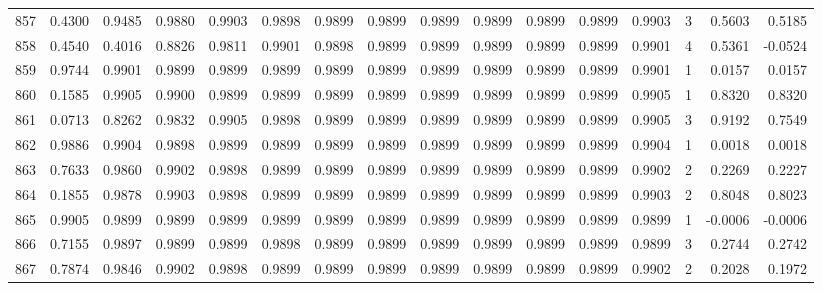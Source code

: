 \begin{tabular}{lrrrrrrrrrrrrrrr}
857 &      0.4300 &  0.9485 &  0.9880 &  0.9903 &  0.9898 &  0.9899 &  0.9899 &  0.9899 &  0.9899 &  0.9899 &   0.9899 &     0.9903 &      3 &                    0.5603 &                     0.5185 \\
858 &      0.4540 &  0.4016 &  0.8826 &  0.9811 &  0.9901 &  0.9898 &  0.9899 &  0.9899 &  0.9899 &  0.9899 &   0.9899 &     0.9901 &      4 &                    0.5361 &                    -0.0524 \\
859 &      0.9744 &  0.9901 &  0.9899 &  0.9899 &  0.9899 &  0.9899 &  0.9899 &  0.9899 &  0.9899 &  0.9899 &   0.9899 &     0.9901 &      1 &                    0.0157 &                     0.0157 \\
860 &      0.1585 &  0.9905 &  0.9900 &  0.9899 &  0.9899 &  0.9899 &  0.9899 &  0.9899 &  0.9899 &  0.9899 &   0.9899 &     0.9905 &      1 &                    0.8320 &                     0.8320 \\
861 &      0.0713 &  0.8262 &  0.9832 &  0.9905 &  0.9898 &  0.9899 &  0.9899 &  0.9899 &  0.9899 &  0.9899 &   0.9899 &     0.9905 &      3 &                    0.9192 &                     0.7549 \\
862 &      0.9886 &  0.9904 &  0.9898 &  0.9899 &  0.9899 &  0.9899 &  0.9899 &  0.9899 &  0.9899 &  0.9899 &   0.9899 &     0.9904 &      1 &                    0.0018 &                     0.0018 \\
863 &      0.7633 &  0.9860 &  0.9902 &  0.9898 &  0.9899 &  0.9899 &  0.9899 &  0.9899 &  0.9899 &  0.9899 &   0.9899 &     0.9902 &      2 &                    0.2269 &                     0.2227 \\
864 &      0.1855 &  0.9878 &  0.9903 &  0.9898 &  0.9899 &  0.9899 &  0.9899 &  0.9899 &  0.9899 &  0.9899 &   0.9899 &     0.9903 &      2 &                    0.8048 &                     0.8023 \\
865 &      0.9905 &  0.9899 &  0.9899 &  0.9899 &  0.9899 &  0.9899 &  0.9899 &  0.9899 &  0.9899 &  0.9899 &   0.9899 &     0.9899 &      1 &                   -0.0006 &                    -0.0006 \\
866 &      0.7155 &  0.9897 &  0.9899 &  0.9899 &  0.9898 &  0.9899 &  0.9899 &  0.9899 &  0.9899 &  0.9899 &   0.9899 &     0.9899 &      3 &                    0.2744 &                     0.2742 \\
867 &      0.7874 &  0.9846 &  0.9902 &  0.9898 &  0.9899 &  0.9899 &  0.9899 &  0.9899 &  0.9899 &  0.9899 &   0.9899 &     0.9902 &      2 &                    0.2028 &                     0.1972 \\

\end{tabular}
